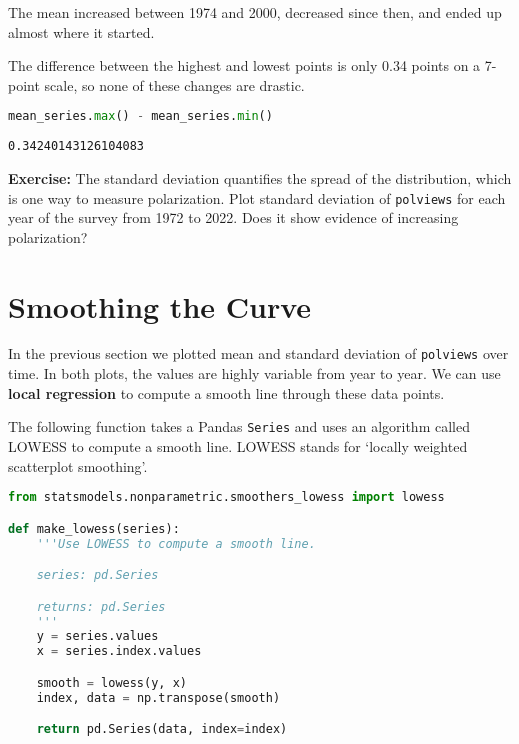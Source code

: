 The mean increased between 1974 and 2000, decreased since then, and
ended up almost where it started.

\pagebreak

The difference between the highest and
lowest points is only 0.34 points on a 7-point scale, so none of these
changes are drastic.

\begin{lstlisting}[language=Python,style=source]
mean_series.max() - mean_series.min()
\end{lstlisting}

\begin{lstlisting}[style=output]
0.34240143126104083
\end{lstlisting}

\textbf{Exercise:} The standard deviation quantifies the spread of the
distribution, which is one way to measure polarization. Plot standard
deviation of \passthrough{\lstinline!polviews!} for each year of the
survey from 1972 to 2022. Does it show evidence of increasing
polarization?

\section{Smoothing the Curve}\label{smoothing-the-curve}

In the previous section we plotted mean and standard deviation of
\passthrough{\lstinline!polviews!} over time. In both plots, the values
are highly variable from year to year. We can use \textbf{local
regression} to compute a smooth line through these data points.

The following function takes a Pandas \passthrough{\lstinline!Series!}
and uses an algorithm called LOWESS to compute a smooth line. LOWESS
stands for `locally weighted scatterplot smoothing'.

\begin{lstlisting}[language=Python,style=source]
from statsmodels.nonparametric.smoothers_lowess import lowess

def make_lowess(series):
    '''Use LOWESS to compute a smooth line.

    series: pd.Series

    returns: pd.Series
    '''
    y = series.values
    x = series.index.values

    smooth = lowess(y, x)
    index, data = np.transpose(smooth)

    return pd.Series(data, index=index)
\end{lstlisting}

